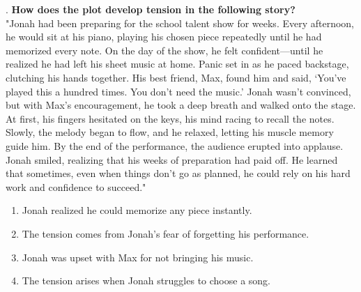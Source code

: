 \documentclass[12pt]{article}
\begin{document}
\vspace{1cm}
. \textbf{How does the plot develop tension in the following story?}\\
"Jonah had been preparing for the school talent show for weeks. Every afternoon, he would sit at his piano, playing his chosen piece repeatedly until he had memorized every note. On the day of the show, he felt confident—until he realized he had left his sheet music at home. Panic set in as he paced backstage, clutching his hands together. His best friend, Max, found him and said, ‘You’ve played this a hundred times. You don’t need the music.’ Jonah wasn’t convinced, but with Max’s encouragement, he took a deep breath and walked onto the stage. At first, his fingers hesitated on the keys, his mind racing to recall the notes. Slowly, the melody began to flow, and he relaxed, letting his muscle memory guide him. By the end of the performance, the audience erupted into applause. Jonah smiled, realizing that his weeks of preparation had paid off. He learned that sometimes, even when things don’t go as planned, he could rely on his hard work and confidence to succeed."  
\begin{enumerate}[label=\Alph*.]
    \item Jonah realized he could memorize any piece instantly.  
    \item The tension comes from Jonah’s fear of forgetting his performance.  
    \item Jonah was upset with Max for not bringing his music.  
    \item The tension arises when Jonah struggles to choose a song.  
\end{enumerate}

\vspace{0.5cm}
\end{document}
